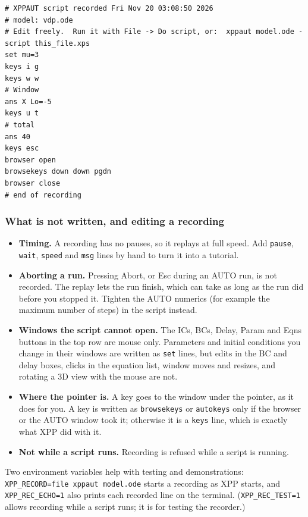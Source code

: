 \documentclass{article}
\providecommand{\tightlist}{\setlength{\itemsep}{0pt}\setlength{\parskip}{0pt}}
\begin{document}
{\small\begin{verbatim}
# XPPAUT script recorded Fri Nov 20 03:08:50 2026
# model: vdp.ode
# Edit freely.  Run it with File -> Do script, or:  xppaut model.ode -script this_file.xps
set mu=3
keys i g
keys w w
# Window
ans X Lo=-5
keys u t
# total
ans 40
keys esc
browser open
browsekeys down down pgdn
browser close
# end of recording
\end{verbatim}}

\subsubsection{What is not written, and editing a recording}

\begin{itemize}
\tightlist
\item
  \textbf{Timing.} A recording has no pauses, so it replays at
  full speed. Add \texttt{pause}, \texttt{wait}, \texttt{speed}
  and \texttt{msg} lines by hand to turn it into a tutorial.
\item
  \textbf{Aborting a run.} Pressing Abort, or Esc during an
  AUTO run, is not recorded. The replay lets the run finish, which can take
  as long as the run did before you stopped it. Tighten the AUTO numerics
  (for example the maximum number of steps) in the script instead.
\item
  \textbf{Windows the script cannot open.} The ICs, BCs, Delay,
  Param and Eqns buttons in the top row are mouse only. Parameters and
  initial conditions you change in their windows are written as
  \texttt{set} lines, but edits in the BC and delay boxes, clicks in
  the equation list, window moves and resizes, and rotating a 3D view with
  the mouse are not.
\item
  \textbf{Where the pointer is.} A key goes to the window under
  the pointer, as it does for you. A key is written as
  \texttt{browsekeys} or \texttt{autokeys} only if the browser or
  the AUTO window took it; otherwise it is a \texttt{keys} line, which
  is exactly what XPP did with it.
\item
  \textbf{Not while a script runs.} Recording is refused while
  a script is running.
\end{itemize}

Two environment variables help with testing and demonstrations:
\texttt{XPP\_RECORD=file\ xppaut\ model.ode} starts a recording as XPP
starts, and \texttt{XPP\_REC\_ECHO=1} also prints each recorded line on
the terminal. (\texttt{XPP\_REC\_TEST=1} allows recording while a
script runs; it is for testing the recorder.)
\end{document}
